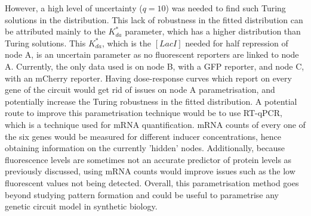 However, a high level of uncertainty ($q=10$) was needed to find such Turing solutions in the distribution.
This lack of robustness in the fitted distribution can be attributed mainly to the $K^*_{da}$ parameter, which has a higher distribution than Turing solutions.
This $K^*_{da}$, which is the $[LacI]$ needed for half repression of node A, is an uncertain parameter as no fluorescent reporters are linked to node A.
Currently, the only data used is on node B, with a GFP reporter, and node
C, with an mCherry reporter.
Having dose-response curves which report on every gene of the circuit would get rid of issues on node A parametrisation, and potentially increase the Turing robustness in the fitted distribution.
A potential route to improve this parametrisation technique would be to use RT-qPCR, which is a technique used for mRNA quantification.
mRNA counts of every one of the six genes would be measured for different inducer concentrations, hence obtaining information on the currently 'hidden' nodes.
Additionally, because fluorescence levels are sometimes not an accurate predictor of protein levels as previously discussed, using mRNA counts would improve issues such as the low fluorescent values not being detected.
Overall, this parametrisation method goes beyond studying pattern formation and could be useful to parametrise any genetic circuit model in synthetic biology.

